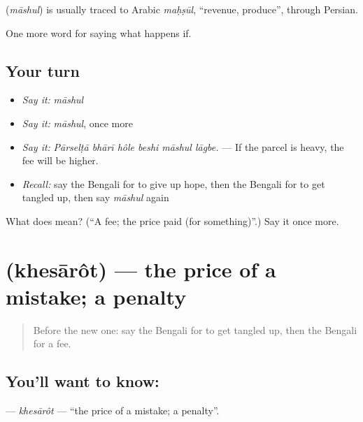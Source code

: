 \begin{cousinweb}
\textbf{} (\emph{māshul}) is usually traced to Arabic \emph{maḥṣūl}, \textquotedblleft{}revenue, produce\textquotedblright{}, through Persian.
\end{cousinweb}

\begin{grammarlens}[title={What you've built}]
One more word for saying what happens if.
\end{grammarlens}

\subsection*{Your turn}
\begin{itemize}
\raggedright
  \item \emph{Say it:} \emph{māshul}
  \item \emph{Say it:} \emph{māshul}, once more
  \item \emph{Say it:} \emph{Pārselṭā bhārī hôle beshi māshul lāgbe.} — If the parcel is heavy, the fee will be higher.
  \item \emph{Recall:} say the Bengali for to give up hope, then the Bengali for to get tangled up, then say \emph{māshul} again
\end{itemize}

\begin{tcolorbox}[breakable,colback=teal!4,colframe=teal!35!black,title={Before you move on}]
What does  mean? (\textquotedblleft{}A fee; the price paid (for something)\textquotedblright{}.) Say it once more.
\end{tcolorbox}
\section[\texorpdfstring{\bn{খেসারত} (khesārôt)}{খেসারত (khesārôt)}]{ (khesārôt) — the price of a mistake; a penalty}

\label{lesson:BN-C540-khesarot}



\begin{quote}
Before the new one: say the Bengali for to get tangled up, then the Bengali for a fee.
\end{quote}

\subsection*{You'll want to know: }
\textbf{} — \emph{khesārôt} — \textquotedblleft{}the price of a mistake; a penalty\textquotedblright{}.

